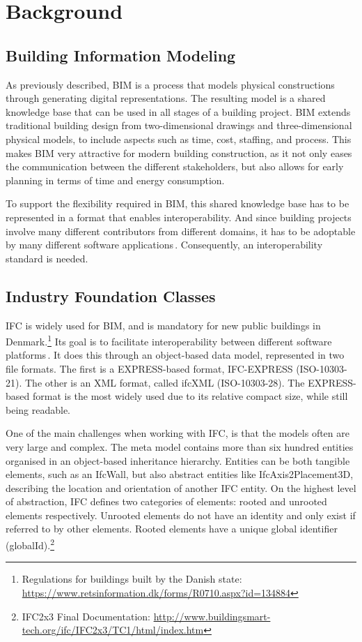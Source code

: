 \section{Background}
\label{sec:background}
\subsection{Building Information Modeling}
\label{sec:building_information_modeling}
As previously described, BIM is a process that models physical constructions through generating digital representations. The resulting model is a shared knowledge base that can be used in all stages of a building project. BIM extends traditional building design from two-dimensional drawings and three-dimensional physical models, to include aspects such as time, cost, staffing, and process. This makes BIM very attractive for modern building construction, as it not only eases the communication between the different stakeholders, but also allows for early planning in terms of time and energy consumption.

To support the flexibility required in BIM, this shared knowledge base has to be represented in a format that enables interoperability. And since building projects involve many different contributors from different domains, it has to be adoptable by many different software applications\,\cite{quteprints37725}. Consequently, an interoperability standard is needed.

\subsection{Industry Foundation Classes}
\label{sec:industry_foundation_classes}
IFC is widely used for BIM, and is mandatory for new public buildings in Denmark.\footnote{Regulations for buildings built by the Danish state: \url{https://www.retsinformation.dk/forms/R0710.aspx?id=134884}} Its goal is to facilitate interoperability between different software platforms\,\cite{steel11}. It does this through an object-based data model, represented in two file formats. The first is a EXPRESS-based format, IFC-EXPRESS (ISO-10303-21). The other is an XML format, called ifcXML (ISO-10303-28). The EXPRESS-based format is the most widely used due to its relative compact size, while still being readable.

One of the main challenges when working with IFC, is that the models often are very large and complex. The meta model contains more than six hundred entities organised in an object-based inheritance hierarchy. Entities can be both tangible elements, such as an IfcWall, but also abstract entities like IfcAxis2Placement3D, describing the location and orientation of another IFC entity. On the highest level of abstraction, IFC defines two categories of elements: rooted and unrooted elements respectively. Unrooted elements do not have an identity and only exist if referred to by other elements. Rooted elements have a unique global identifier (globalId).\footnote{IFC2x3 Final Documentation: \url{http://www.buildingsmart-tech.org/ifc/IFC2x3/TC1/html/index.htm}}

